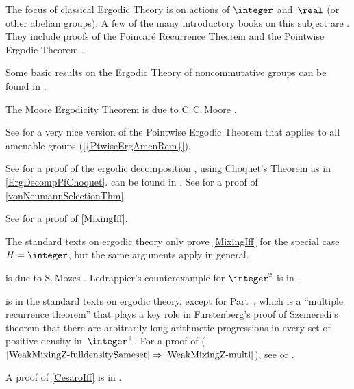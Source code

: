 \begin{notes}

The focus of classical Ergodic Theory is on actions of $\integer$ and~$\real$ (or other abelian groups). A few of the many introductory books on this subject are \cite{EinsiedlerWard-ErgThyViewNumThy, Halmos, KatokHasselblatt-intro, Walters}. They include proofs of the Poincar\'e Recurrence Theorem  and the Pointwise Ergodic Theorem .

Some basic results on the Ergodic Theory of noncommutative groups can be found in \cite[\S2.1]{ZimmerBook}.

The Moore Ergodicity Theorem  is due to C.\,C.\,Moore \cite{Moore-ergodicity}. 

See \cite{Lindenstrauss-Ptwise} for a very nice version of the Pointwise Ergodic Theorem that applies to all amenable groups (\cref{{PtwiseErgAmenRem}}).

See \cite[Thm.~1.1 (and Thm.~5.2)]{GreschonigSchmidt} for a proof of the ergodic decomposition , using Choquet's Theorem as in \cref{ErgDecompPfChoquet}.
 can be found in \cite[\S3]{Rohlin-FundIdeas}.
See \cite[\S5.5]{Srivastava-BorelSets} for a proof of \cref{vonNeumannSelectionThm}.

See \cite[Prop.~1, pp.~157--158]{Moore-ergodicity} for a proof of \cref{MixingIff}.

The standard texts on ergodic theory only prove \cref{MixingIff} for the special case $H = \integer$, but the same arguments apply in general.

 is due to S.\,Mozes \cite{Mozes-MixingAllOrders}. Ledrappier's counterexample for $\integer^2$ is in 
\cite{Ledrappier-ChampMarkovien}.

 is in the standard texts on ergodic theory, except for Part~, which is a ``multiple recurrence theorem'' that plays a key role in Furstenberg's proof of Szemeredi's theorem that there are arbitrarily long arithmetic progressions in every set of positive density in~$\integer^+$. For a proof of ($\ref{WeakMixingZ-fulldensitySameset} \Rightarrow \ref{WeakMixingZ-multi}$), see 
\cite[Prop.~7.13, p.~191]{EinsiedlerWard-ErgThyViewNumThy} 
or 
\cite[Thm.~4.10]{Furstenberg-RecErgThyCombNumThy}.

A proof of \cref{CesaroIff} is in \cite[Lem.~2.41, p.~54]{EinsiedlerWard-ErgThyViewNumThy}.
\end{notes}


